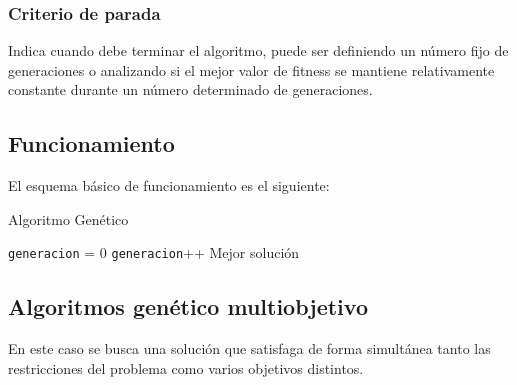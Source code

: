 \subsubsection{Criterio de parada} 
Indica cuando debe terminar el algoritmo, puede ser definiendo un número fijo de generaciones o analizando si el mejor valor de fitness se mantiene relativamente constante durante un número determinado de generaciones.

\subsection{Funcionamiento}

El esquema básico de funcionamiento es el siguiente:


\begin{algorithm}%
	\caption{Algoritmo Genético}
	\label{alg:algoritmo_genetico_simple}
	\begin{algorithmic} [1] 
		{
			\STATE \texttt{generacion} = 0
			\STATE \texttt{generacion}++
			\ENDWHILE
			\RETURN Mejor solución
		}
	\end{algorithmic}
\end{algorithm}



%
%


\subsection{Algoritmos genético multiobjetivo}

En este caso se busca una solución que satisfaga de forma simultánea tanto las restricciones del problema como varios objetivos distintos.



